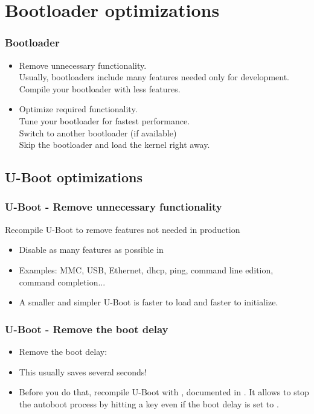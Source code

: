 \section{Bootloader optimizations}

\begin{frame}
\frametitle{Bootloader}
\begin{itemize}

\item Remove unnecessary functionality.\\
      Usually, bootloaders include many features needed only for
      development. Compile your bootloader with less features.
\item Optimize required functionality.\\
      Tune your bootloader for fastest performance. \\
      Switch to another bootloader (if available) \\
      Skip the bootloader and load the kernel right away.
\end{itemize}
\end{frame}

\subsection{U-Boot optimizations}

\begin{frame}
\frametitle{U-Boot - Remove unnecessary functionality}
Recompile U-Boot to remove features not needed in production
\begin{itemize}
\item Disable as many features as possible
      in 
\item Examples: MMC, USB, Ethernet, dhcp, ping, command line edition,
      command completion...
\item A smaller and simpler U-Boot is faster to load and faster
      to initialize.
\end{itemize}
\end{frame}

\begin{frame}
\frametitle{U-Boot - Remove the boot delay}
\begin{itemize}
\item Remove the boot delay:\\
\item This usually saves several seconds!
\item Before you do that, recompile U-Boot with
      , documented in
      . It allows to stop the autoboot
      process by hitting a key even if the boot delay is set to
      .
\end{itemize}
\end{frame}

